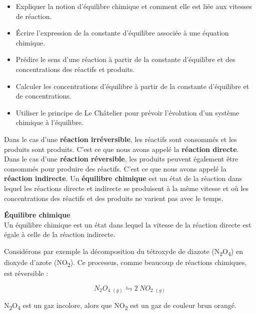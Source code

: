 \documentclass[
  11pt,
  a4paper,
  openany]{book}
\providecommand{\tightlist}{%
  \setlength{\itemsep}{0pt}\setlength{\parskip}{0pt}}
\begin{document}
\begin{objectives}

\begin{itemize}
\tightlist
\item
  Expliquer la notion d'équilibre chimique et comment elle est liée aux vitesses de réaction.
\item
  Écrire l'expression de la constante d'équilibre associée à une équation chimique.
\item
  Prédire le sens d'une réaction à partir de la constante d'équilibre et des concentrations des réactifs et produits.
\item
  Calculer les concentrations d'équilibre à partir de la constante d'équilibre et de concentrations.
\item
  Utiliser le principe de Le Châtelier pour prévoir l'évolution d'un système chimique à l'équilibre.
\end{itemize}

\end{objectives}

Dans le cas d'une \textbf{réaction irréversible}, les réactifs sont consommés et les produits sont produits. C'est ce que nous avons appelé la \textbf{réaction directe}. Dans le cas d'une \textbf{réaction réversible}, les produits peuvent également être consommés pour produire des réactifs. C'est ce que nous avons appelé la \textbf{réaction indirecte}. Un \textbf{équilibre chimique} est un état de la réaction dans lequel les réactions directe et indirecte se produisent à la même vitesse et où les concentrations des réactifs et des produits ne varient pas avec le temps.

\begin{tcolorbox}
\textbf{Équilibre chimique}\\
\hspace{0pt}Un équilibre chimique est un état dans lequel la vitesse de la réaction directe est égale à celle de la réaction indirecte.

\end{tcolorbox}

Considérons par exemple la décomposition du tétroxyde de diazote (N\textsubscript{2}O\textsubscript{4}) en dioxyde d'azote (NO\textsubscript{2}). Ce processus, comme beaucoup de réactions chimiques, est réversible :

\[
  N_2O_4\ {}_{(g)} \leftrightharpoons 2\ NO_2\ {}_{(g)}
\]

N\textsubscript{2}O\textsubscript{4} est un gaz incolore, alors que NO\textsubscript{2} est un gaz de couleur brun orangé.
\end{document}
